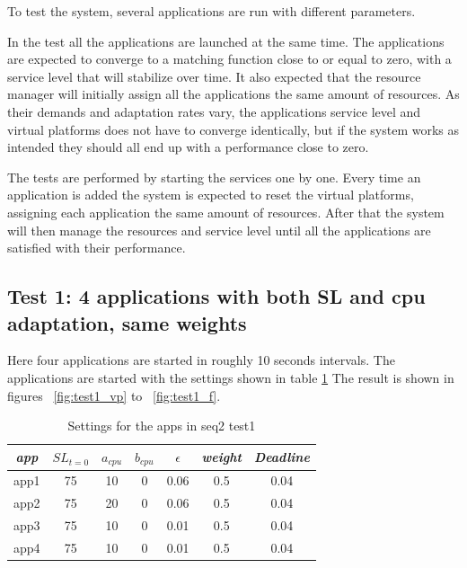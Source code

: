 \documentclass[nobiblatex]{LTHthesis}
\begin{document}
To test the system, several applications are run with different parameters.

In the test all the applications are launched at the same time. The applications are expected to converge to a matching function close to or equal to zero, with a service level that will stabilize over time. It also expected that the resource manager will initially assign all the applications the same amount of resources. As their demands and adaptation rates vary, the applications service level and virtual platforms does not have to converge identically, but if the system works as intended they should all end up with a performance close to zero.

The tests are performed by starting the services one by one. Every time an application is added the system is expected to reset the virtual platforms, assigning each application the same amount of resources. After that the system will then manage the resources and service level until all the applications are satisfied with their performance.



\subsection{Test 1: 4 applications with both SL and cpu adaptation, same weights}

Here four applications are started in roughly 10 seconds intervals. The applications are started with the settings shown in table \ref{tab:settings_test1}
The result is shown in figures ~\ref{fig:test1_vp} to ~\ref{fig:test1_f}. 
\begin{table}[h]
  \centering
  \begin{tabular}{|c|c|c|c|c|c|c|}
 	\hline 
   \emph{app} & $SL_{t=0}$ & \textbf{$a_{cpu}$} & \textbf{$b_{cpu}$} & \textbf{$\epsilon$} & \emph{weight} & \emph{Deadline} \\ \hline
	app1 & 75 & 10 & 0 & 0.06 & 0.5 &0.04  \\ \hline
	app2 & 75 & 20 & 0 & 0.06 & 0.5 &0.04  \\ \hline
	app3 & 75 & 10 & 0 & 0.01 & 0.5 &0.04  \\ \hline
	app4 & 75 & 10 & 0 & 0.01 & 0.5 &0.04  \\ \hline        
  \end{tabular}
  \caption{Settings for the apps in seq2 test1}
  \label{tab:settings_test1}
\end{table}
\end{document}
